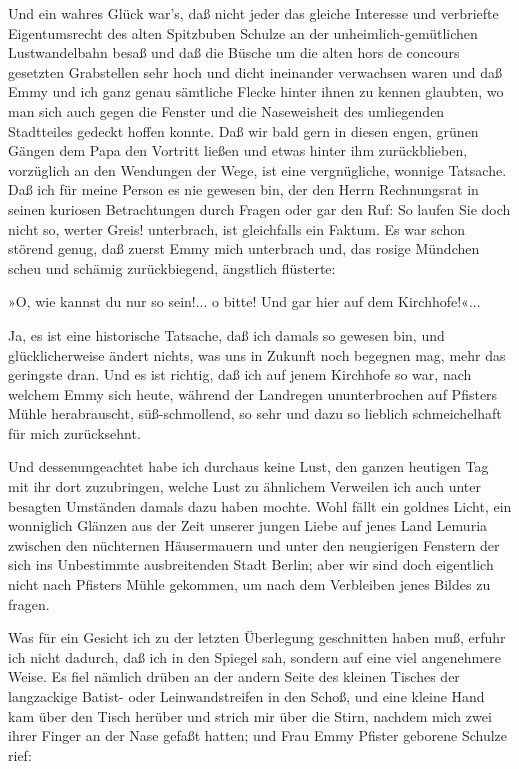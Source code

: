 Und ein wahres Glück war's, daß nicht jeder das gleiche Interesse
und verbriefte Eigentumsrecht des alten Spitzbuben Schulze an der
unheimlich-gemütlichen Lustwandelbahn besaß und daß die Büsche um
die alten hors de concours gesetzten Grabstellen sehr hoch und
dicht ineinander verwachsen waren und daß Emmy und ich ganz genau
sämtliche Flecke hinter ihnen zu kennen glaubten, wo man sich auch
gegen die Fenster und die Naseweisheit des umliegenden Stadtteiles
gedeckt hoffen konnte. Daß wir bald gern in diesen engen, grünen
Gängen dem Papa den Vortritt ließen und etwas hinter ihm
zurückblieben, vorzüglich an den Wendungen der Wege, ist eine
vergnügliche, wonnige Tatsache. Daß ich für meine Person es nie
gewesen bin, der den Herrn Rechnungsrat in seinen kuriosen
Betrachtungen durch Fragen oder gar den Ruf: So laufen Sie doch
nicht so, werter Greis! unterbrach, ist gleichfalls ein Faktum. Es
war schon störend genug, daß zuerst Emmy mich unterbrach und, das
rosige Mündchen scheu und schämig zurückbiegend, ängstlich
flüsterte:

»O, wie kannst du nur so sein!... o bitte! Und gar hier auf dem
Kirchhofe!«...

Ja, es ist eine historische Tatsache, daß ich damals so gewesen
bin, und glücklicherweise ändert nichts, was uns in Zukunft noch
begegnen mag, mehr das geringste dran. Und es ist richtig, daß ich
auf jenem Kirchhofe so war, nach welchem Emmy sich heute, während
der Landregen ununterbrochen auf Pfisters Mühle herabrauscht,
süß-schmollend, so sehr und dazu so lieblich schmeichelhaft für
mich zurücksehnt.

Und dessenungeachtet habe ich durchaus keine Lust, den ganzen
heutigen Tag mit ihr dort zuzubringen, welche Lust zu ähnlichem
Verweilen ich auch unter besagten Umständen damals dazu haben
mochte. Wohl fällt ein goldnes Licht, ein wonniglich Glänzen aus
der Zeit unserer jungen Liebe auf jenes Land Lemuria zwischen den
nüchternen Häusermauern und unter den neugierigen Fenstern der sich
ins Unbestimmte ausbreitenden Stadt Berlin; aber wir sind doch
eigentlich nicht nach Pfisters Mühle gekommen, um nach dem
Verbleiben jenes Bildes zu fragen.

Was für ein Gesicht ich zu der letzten Überlegung geschnitten haben
muß, erfuhr ich nicht dadurch, daß ich in den Spiegel sah, sondern
auf eine viel angenehmere Weise. Es fiel nämlich drüben an der
andern Seite des kleinen Tisches der langzackige Batist- oder
Leinwandstreifen in den Schoß, und eine kleine Hand kam über den
Tisch herüber und strich mir über die Stirn, nachdem mich zwei
ihrer Finger an der Nase gefaßt hatten; und Frau Emmy Pfister
geborene Schulze rief:

